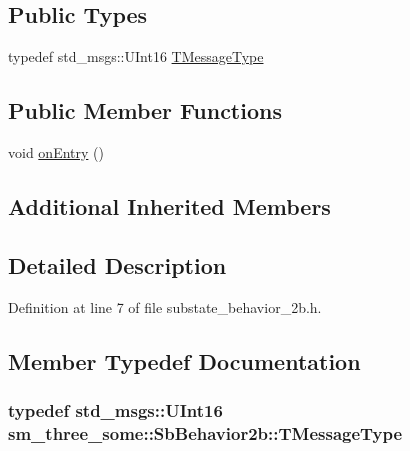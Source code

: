 \subsection*{Public Types}
\begin{DoxyCompactItemize}
\item 
typedef std\+\_\+msgs\+::\+U\+Int16 \hyperlink{classsm__three__some_1_1SbBehavior2b_a72275862aa88c77963ed3ff06fcb0143}{T\+Message\+Type}
\end{DoxyCompactItemize}
\subsection*{Public Member Functions}
\begin{DoxyCompactItemize}
\item 
void \hyperlink{classsm__three__some_1_1SbBehavior2b_a74a30639e7473d44c1f7b8f0bbfab799}{on\+Entry} ()
\end{DoxyCompactItemize}
\subsection*{Additional Inherited Members}


\subsection{Detailed Description}


Definition at line 7 of file substate\+\_\+behavior\+\_\+2b.\+h.



\subsection{Member Typedef Documentation}
\subsubsection[{\texorpdfstring{T\+Message\+Type}{TMessageType}}]{\setlength{\rightskip}{0pt plus 5cm}typedef std\+\_\+msgs\+::\+U\+Int16 {\bf sm\+\_\+three\+\_\+some\+::\+Sb\+Behavior2b\+::\+T\+Message\+Type}}\hypertarget{classsm__three__some_1_1SbBehavior2b_a72275862aa88c77963ed3ff06fcb0143}{}\label{classsm__three__some_1_1SbBehavior2b_a72275862aa88c77963ed3ff06fcb0143}


